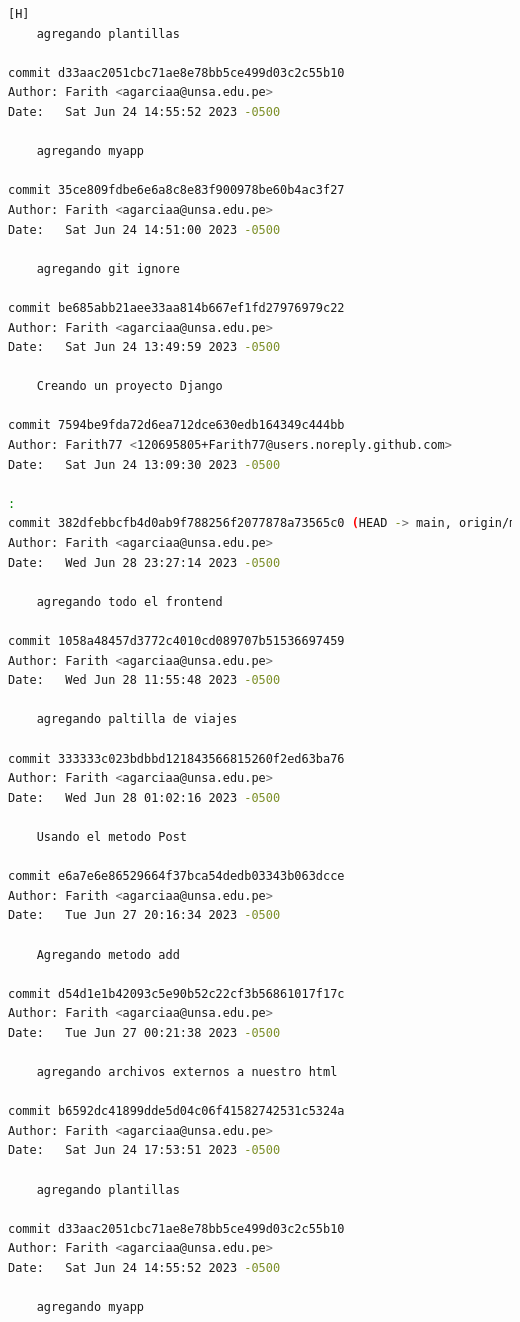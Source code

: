 \documentclass{article}
\begin{document}
\begin{lstlisting}[language=bash,caption={Todos los commit hechos para el laboratorio 6}][H]
    agregando plantillas

commit d33aac2051cbc71ae8e78bb5ce499d03c2c55b10
Author: Farith <agarciaa@unsa.edu.pe>
Date:   Sat Jun 24 14:55:52 2023 -0500

    agregando myapp

commit 35ce809fdbe6e6a8c8e83f900978be60b4ac3f27
Author: Farith <agarciaa@unsa.edu.pe>
Date:   Sat Jun 24 14:51:00 2023 -0500

    agregando git ignore

commit be685abb21aee33aa814b667ef1fd27976979c22
Author: Farith <agarciaa@unsa.edu.pe>
Date:   Sat Jun 24 13:49:59 2023 -0500

    Creando un proyecto Django

commit 7594be9fda72d6ea712dce630edb164349c444bb
Author: Farith77 <120695805+Farith77@users.noreply.github.com>
Date:   Sat Jun 24 13:09:30 2023 -0500

:
commit 382dfebbcfb4d0ab9f788256f2077878a73565c0 (HEAD -> main, origin/main, origin/HEAD)
Author: Farith <agarciaa@unsa.edu.pe>
Date:   Wed Jun 28 23:27:14 2023 -0500

    agregando todo el frontend

commit 1058a48457d3772c4010cd089707b51536697459
Author: Farith <agarciaa@unsa.edu.pe>
Date:   Wed Jun 28 11:55:48 2023 -0500

    agregando paltilla de viajes

commit 333333c023bdbbd121843566815260f2ed63ba76
Author: Farith <agarciaa@unsa.edu.pe>
Date:   Wed Jun 28 01:02:16 2023 -0500

    Usando el metodo Post

commit e6a7e6e86529664f37bca54dedb03343b063dcce
Author: Farith <agarciaa@unsa.edu.pe>
Date:   Tue Jun 27 20:16:34 2023 -0500

    Agregando metodo add

commit d54d1e1b42093c5e90b52c22cf3b56861017f17c
Author: Farith <agarciaa@unsa.edu.pe>
Date:   Tue Jun 27 00:21:38 2023 -0500

    agregando archivos externos a nuestro html

commit b6592dc41899dde5d04c06f41582742531c5324a
Author: Farith <agarciaa@unsa.edu.pe>
Date:   Sat Jun 24 17:53:51 2023 -0500

    agregando plantillas

commit d33aac2051cbc71ae8e78bb5ce499d03c2c55b10
Author: Farith <agarciaa@unsa.edu.pe>
Date:   Sat Jun 24 14:55:52 2023 -0500

    agregando myapp


\end{lstlisting}
\end{document}
